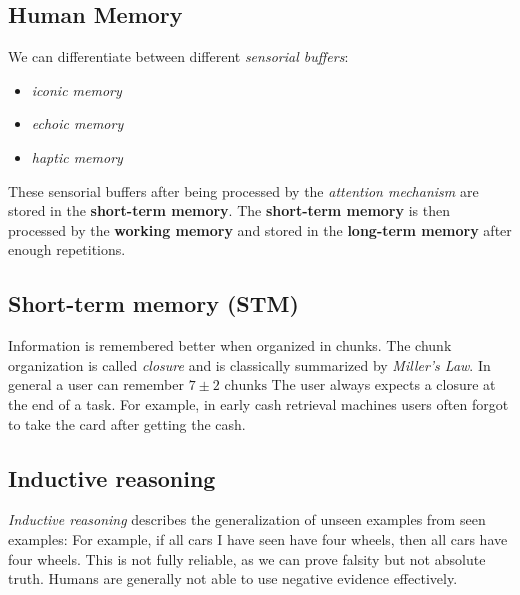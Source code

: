 \documentclass[11pt,a4paper]{article}
\theoremstyle{definition}
\theoremstyle{plain}
\theoremstyle{remark}
\begin{document}
\subsection{Human Memory}
We can differentiate between different \textit{sensorial buffers}:
\begin{itemize}
    \item \textit{iconic memory}
    \item \textit{echoic memory}
    \item \textit{haptic memory}
\end{itemize}
These sensorial buffers after being processed by the \textit{attention mechanism} are stored in the \textbf{short-term memory}.
The \textbf{short-term memory} is then processed by the \textbf{working memory} and stored in the \textbf{long-term memory} after 
enough repetitions.

\subsection{Short-term memory (STM)}

\begin{tcolorbox}[colback=yellow!5!white,colframe=yellow!75!black,title=\textbf{Miller's Law and Chunking}]
Information is remembered better when organized in chunks.
The chunk organization is called \textit{closure} and is classically summarized by \textit{Miller's Law}.
In general a user can remember 
\begin{math}
    7 \pm 2 \text{ chunks}
\end{math}
The user always expects a closure at the end of a task. For example, in early cash retrieval
machines users often forgot to take the card after getting the cash.
\end{tcolorbox}


\subsection{Inductive reasoning}
\textit{Inductive reasoning} describes the generalization of unseen examples from seen examples:
For example, if all cars I have seen have four wheels, then all cars have four wheels.
This is not fully reliable, as we can prove falsity but not absolute truth.
Humans are generally not able to use negative evidence effectively.
\end{document}
